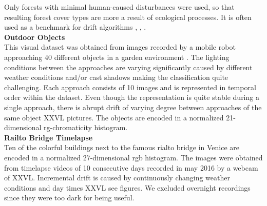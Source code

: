 \documentclass[conference]{IEEEtran}
\begin{document}
Only forests with minimal human-caused disturbances were used, so that resulting forest cover types are more a result of ecological processes.
It is often used as a benchmark for drift algorithms \cite{Bifet:2013:EDS:2480362.2480516}, \cite{gama2003accurate}, \cite{oza2001experimental}.\\
\textbf{Outdoor Objects}\\
This visual dataset was obtained from images recorded by a mobile robot approaching 40 different objects in a garden environment \cite{losing2015interactive}. The lighting conditions between 
the approaches are varying significantly caused by different weather conditions and/or cast shadows making the classification quite challenging. Each approach
consists of 10 images and is represented in temporal order within the dataset. Even though the representation is quite stable during a single approach, there is abrupt drift of varying degree between
approaches of the same object XXVL pictures. The objects are encoded in a normalized 21-dimensional rg-chromaticity histogram.\\
\textbf{Railto Bridge Timelapse}\\
Ten of the colorful buildings next to the famous rialto bridge in Venice are encoded in a normalized 27-dimensional rgb histogram. 
The images were obtained from timelapse videos of 10 consecutive days recorded in may 2016 by a webcam of XXVL. Incremental drift is caused by continuously changing weather conditions and
day times XXVL see figures. We excluded overnight recordings since they were too dark for being useful.
\end{document}
